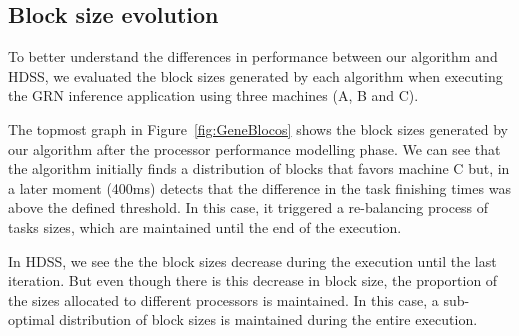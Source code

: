 \documentclass[journal]{IEEEtran}
\begin{document}
\subsection{Block size evolution}

To better understand the differences in performance between our algorithm and
HDSS, we evaluated the block sizes generated by each algorithm when executing
the GRN inference application using three machines (A, B and C).



The topmost graph in Figure~\ref{fig:GeneBlocos} shows the block sizes generated
by our algorithm after the processor performance modelling phase. We can see
that the algorithm initially finds a distribution of blocks that favors machine
C but, in a later moment (400ms) detects that the difference in the task
finishing times was above the defined threshold. In this case, it triggered a
re-balancing process of tasks sizes, which are maintained until the end of the
execution.

In HDSS, we see the the block sizes decrease during the execution until the last
iteration. But even though there is this decrease in block size, the proportion
of the sizes allocated to different processors is maintained. In this case, a
sub-optimal distribution of block sizes is maintained during the entire
execution.

\end{document}
